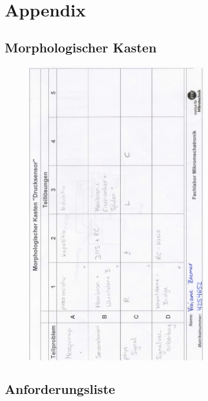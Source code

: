 \chapter{Appendix}
\section{Morphologischer Kasten}
\label{sec:Anhang_1}

\begin{figure}[H]
	\centering
	\includegraphics[width=0.7\textwidth]{figures/MorphologischerKasten_Bremer.png}
\end{figure}
\begin{figure}[H]
\centering

\end{figure}


\newpage
\section{Anforderungsliste}
\label{sec:Anhang_2}

